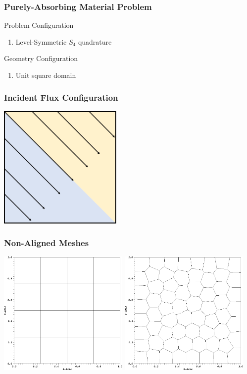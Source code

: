 \documentclass[compress,10pt]{beamer}
\begin{document}
\begin{frame}[t]
{
\frametitle{Purely-Absorbing Material Problem}
\begin{block}{Problem Configuration}
\begin{enumerate}
\item Level-Symmetric $S_4$ quadrature
\end{enumerate}
\end{block}
\begin{block}{Geometry Configuration}
\begin{enumerate}
\item Unit square domain
\end{enumerate}
\end{block}
}
{
\frametitle{Incident Flux Configuration}
\vspace{1cm}
\hspace*{2.75cm}
{}\includegraphics[width=0.45\textwidth]{images/PA_Shading.png}
}
{
\frametitle{Non-Aligned Meshes}
\vspace{0.75cm}
\hspace*{0.25cm}
{}\includegraphics[width=0.475\textwidth]{images/PAMesh_Cart.png} 
{}\includegraphics[width=0.475\textwidth]{images/PAMesh_Poly.png}
}
\end{frame}
\end{document}
